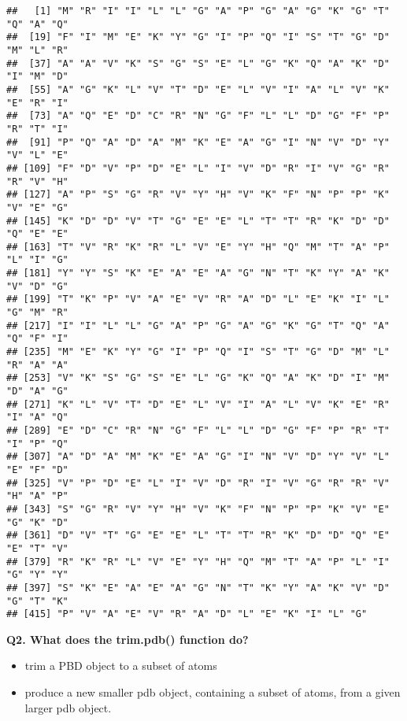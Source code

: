 \documentclass[]{article}
\newenvironment{Shaded}{\begin{snugshade}}{\end{snugshade}}
\newcommand{\KeywordTok}[1]{\textcolor[rgb]{0.13,0.29,0.53}{\textbf{#1}}}
\newcommand{\NormalTok}[1]{#1}
\newcommand{\OperatorTok}[1]{\textcolor[rgb]{0.81,0.36,0.00}{\textbf{#1}}}
\providecommand{\tightlist}{%
  \setlength{\itemsep}{0pt}\setlength{\parskip}{0pt}}
\begin{document}
\begin{Shaded}
\end{Shaded}

\begin{verbatim}
##   [1] "M" "R" "I" "I" "L" "L" "G" "A" "P" "G" "A" "G" "K" "G" "T" "Q" "A" "Q"
##  [19] "F" "I" "M" "E" "K" "Y" "G" "I" "P" "Q" "I" "S" "T" "G" "D" "M" "L" "R"
##  [37] "A" "A" "V" "K" "S" "G" "S" "E" "L" "G" "K" "Q" "A" "K" "D" "I" "M" "D"
##  [55] "A" "G" "K" "L" "V" "T" "D" "E" "L" "V" "I" "A" "L" "V" "K" "E" "R" "I"
##  [73] "A" "Q" "E" "D" "C" "R" "N" "G" "F" "L" "L" "D" "G" "F" "P" "R" "T" "I"
##  [91] "P" "Q" "A" "D" "A" "M" "K" "E" "A" "G" "I" "N" "V" "D" "Y" "V" "L" "E"
## [109] "F" "D" "V" "P" "D" "E" "L" "I" "V" "D" "R" "I" "V" "G" "R" "R" "V" "H"
## [127] "A" "P" "S" "G" "R" "V" "Y" "H" "V" "K" "F" "N" "P" "P" "K" "V" "E" "G"
## [145] "K" "D" "D" "V" "T" "G" "E" "E" "L" "T" "T" "R" "K" "D" "D" "Q" "E" "E"
## [163] "T" "V" "R" "K" "R" "L" "V" "E" "Y" "H" "Q" "M" "T" "A" "P" "L" "I" "G"
## [181] "Y" "Y" "S" "K" "E" "A" "E" "A" "G" "N" "T" "K" "Y" "A" "K" "V" "D" "G"
## [199] "T" "K" "P" "V" "A" "E" "V" "R" "A" "D" "L" "E" "K" "I" "L" "G" "M" "R"
## [217] "I" "I" "L" "L" "G" "A" "P" "G" "A" "G" "K" "G" "T" "Q" "A" "Q" "F" "I"
## [235] "M" "E" "K" "Y" "G" "I" "P" "Q" "I" "S" "T" "G" "D" "M" "L" "R" "A" "A"
## [253] "V" "K" "S" "G" "S" "E" "L" "G" "K" "Q" "A" "K" "D" "I" "M" "D" "A" "G"
## [271] "K" "L" "V" "T" "D" "E" "L" "V" "I" "A" "L" "V" "K" "E" "R" "I" "A" "Q"
## [289] "E" "D" "C" "R" "N" "G" "F" "L" "L" "D" "G" "F" "P" "R" "T" "I" "P" "Q"
## [307] "A" "D" "A" "M" "K" "E" "A" "G" "I" "N" "V" "D" "Y" "V" "L" "E" "F" "D"
## [325] "V" "P" "D" "E" "L" "I" "V" "D" "R" "I" "V" "G" "R" "R" "V" "H" "A" "P"
## [343] "S" "G" "R" "V" "Y" "H" "V" "K" "F" "N" "P" "P" "K" "V" "E" "G" "K" "D"
## [361] "D" "V" "T" "G" "E" "E" "L" "T" "T" "R" "K" "D" "D" "Q" "E" "E" "T" "V"
## [379] "R" "K" "R" "L" "V" "E" "Y" "H" "Q" "M" "T" "A" "P" "L" "I" "G" "Y" "Y"
## [397] "S" "K" "E" "A" "E" "A" "G" "N" "T" "K" "Y" "A" "K" "V" "D" "G" "T" "K"
## [415] "P" "V" "A" "E" "V" "R" "A" "D" "L" "E" "K" "I" "L" "G"
\end{verbatim}

\textbf{Q2. What does the trim.pdb() function do?}

\begin{itemize}
\tightlist
\item
  trim a PBD object to a subset of atoms
\item
  produce a new smaller pdb object, containing a subset of atoms, from a
  given larger pdb object.
\end{itemize}
\end{document}
